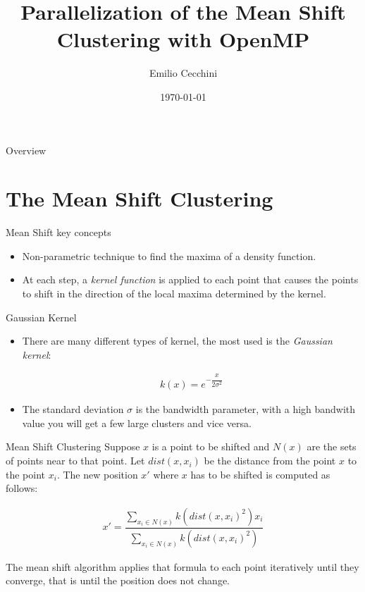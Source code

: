 \documentclass{beamer}
\title{Parallelization of the Mean Shift Clustering with OpenMP}
\author{Emilio Cecchini}
\institute{
    Università degli Studi di Firenze \\
    \medskip
    \textit{emilio.cecchini@stud.unfi.it}
}
\date{\today}
\begin{document}
\maketitle


\begin{frame}{Overview}
\tableofcontents
\end{frame}


\section{The Mean Shift Clustering}

\begin{frame}{Mean Shift key concepts}

\begin{itemize}
\item
Non-parametric technique to find the maxima of a density function.
\item
At each step, a \textit{kernel function} is applied to each point that causes the points to shift in the direction of the local maxima determined by the kernel.
\end{itemize}

\end{frame}


\begin{frame}{Gaussian Kernel}

\begin{itemize}
\item
There are many different types of kernel, the most used is the \textit{Gaussian kernel}:

\begin{align*}
k(x) =  e^{-\dfrac{x}{2\sigma^2}}
\end{align*}
\item
The standard deviation $\sigma$ is the bandwidth parameter, with a high bandwith value you will get a few large clusters and vice versa.
\end{itemize}

\end{frame}


\begin{frame}{Mean Shift Clustering}
Suppose $x$ is a point to be shifted and $N(x)$ are the sets of points near to that point. Let $dist(x, x_i)$ be the distance from the point $x$ to the point $x_i$. The new position $x'$ where $x$ has to be shifted is computed as follows:

\begin{align*}
x' = \dfrac{\sum_{x_i \in N(x)} k(dist(x,x_i)^2) x_i}{\sum_{x_i \in N(x)} k(dist(x, x_i)^2)}
\end{align*}

The mean shift algorithm applies that formula to each point iteratively until they converge, that is until the position does not change.
\end{frame}
\end{document}
